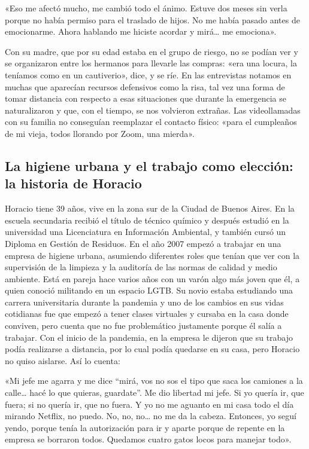 \begin{refsection}
\begin{gbcita}
«Eso me afectó mucho, me cambió todo el ánimo. Estuve dos meses sin verla porque no había permiso para el traslado de hijos. No me había pasado antes de emocionarme. Ahora hablando me hiciste acordar y mirá… me emociona».

\end{gbcita}

Con su madre, que por su edad estaba en el grupo de riesgo, no se podían ver y se organizaron entre los hermanos para llevarle las compras: «era una locura, la teníamos como en un cautiverio», dice, y se ríe. En las entrevistas notamos en muchas que aparecían recursos defensivos como la risa, tal vez una forma de tomar distancia con respecto a esas situaciones que durante la emergencia se naturalizaron y que, con el tiempo, se nos volvieron extrañas. Las videollamadas con su familia no conseguían reemplazar el contacto físico: «para el cumpleaños de mi vieja, todos llorando por Zoom, una mierda».


\subsection[La higiene urbana y el trabajo como elección: la historia de Horacio]{La higiene urbana y el trabajo como elección: la historia de Horacio}
\label{cap-29.la-higiene-urbana-y-el-trabajo-como-eleccion-la-historia-de-horacio}
Horacio tiene 39 años, vive en la zona sur de la Ciudad de Buenos Aires. En la escuela secundaria recibió el título de técnico químico y después estudió en la universidad una Licenciatura en Información Ambiental, y también cursó un Diploma en Gestión de Residuos. En el año 2007 empezó a trabajar en una empresa de higiene urbana, asumiendo diferentes roles que tenían que ver con la supervisión de la limpieza y la auditoría de las normas de calidad y medio ambiente. Está en pareja hace varios años con un varón algo más joven que él, a quien conoció militando en un espacio LGTB. Su novio estaba estudiando una carrera universitaria durante la pandemia y uno de los cambios en sus vidas cotidianas fue que empezó a tener clases virtuales y cursaba en la casa donde conviven, pero cuenta que no fue problemático justamente porque él salía a trabajar. Con el inicio de la pandemia, en la empresa le dijeron que su trabajo podía realizarse a distancia, por lo cual podía quedarse en su casa, pero Horacio no quiso aislarse. Así lo cuenta:


\begin{gbcita}
«Mi jefe me agarra y me dice “mirá, vos no sos el tipo que saca los camiones a la calle… hacé lo que quieras, guardate”. Me dio libertad mi jefe. Si yo quería ir, que fuera; si no quería ir, que no fuera. Y yo no me aguanto en mi casa todo el día mirando Netflix, no puedo. No, no, no… no me da la cabeza. Entonces, yo seguí yendo, porque tenía la autorización para ir y aparte porque de repente en la empresa se borraron todos. Quedamos cuatro gatos locos para manejar todo».


\end{gbcita}
\end{refsection}
